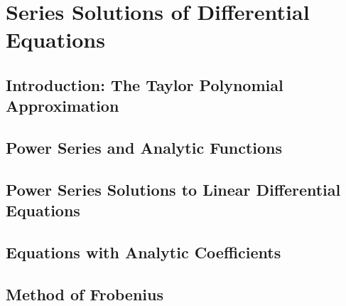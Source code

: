 \documentclass[../diffeq.tex]{subfiles}
\begin{document}
\chapter{Series Solutions of Differential Equations}
\section{Introduction: The Taylor Polynomial Approximation}
\section{Power Series and Analytic Functions}
\section{Power Series Solutions to Linear Differential Equations}
\section{Equations with Analytic Coefficients}
\section{Method of Frobenius}
\end{document}
